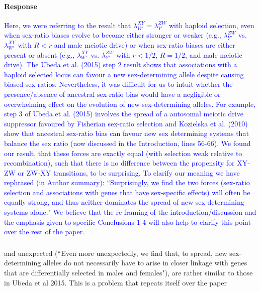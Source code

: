 \documentclass[10pt,letterpaper]{article}
\begin{document}
\noindent\paragraph{Response}
\textcolor{blue}{Here, we were referring to the result that $\lambda_{W'}^{XY} = \lambda_{Y'}^{ZW}$ with haploid selection, even when sex-ratio biases evolve to become either stronger or weaker (e.g., $\lambda_{Y'}^{ZW}$ vs. $\lambda_{W'}^{XY}$ with $R<r$ and male meiotic drive) or when sex-ratio biases are either present or absent (e.g., $\lambda_{W'}^{XY}$ vs. $\lambda_{Y'}^{ZW}$ with $r<1/2$, $R=1/2$, and male meiotic drive). The Ubeda et al. (2015) step 2 result shows that associations with a haploid selected locus can favour a new sex-determining allele despite causing biased sex ratios. Nevertheless, it was difficult for us to intuit whether the presence/absence of ancestral sex-ratio bias would have a negligible or overwhelming effect on the evolution of new sex-determining alleles. For example, step 3 of Ubeda et al. (2015) involves the spread of a autosomal meiotic drive suppressor favoured by Fisherian sex-ratio selection and Kozielska et al. (2010) show that ancestral sex-ratio bias can favour new sex determining systems that balance the sex ratio (now discussed in the Introduction, lines 56-66). We found our result, that these forces are exactly equal (with selection weak relative to recombination), such that there is no difference between the propensity for XY-ZW or ZW-XY transitions, to be surprising.
To clarify our meaning we have rephrased (in Author summary): ``Surprisingly, we find the two forces (sex-ratio selection and associations with genes that have sex-specific effects) will often be equally strong, and thus neither dominates the spread of new sex-determining systems alone." We believe that the re-framing of the introduction/discussion and the emphasis given to specific Conclusions 1-4 will also help to clarify this point over the rest of the paper. }

\noindent\subsubsection{}
\noindent and unexpected (``Even more unexpectedly, we find that, to spread, new sex-determining alleles do not necessarily have to arise in closer linkage with genes that are differentially selected in males and females"), are rather similar to those in Ubeda et al 2015. This is a problem that repeats itself over the paper 
\end{document}
